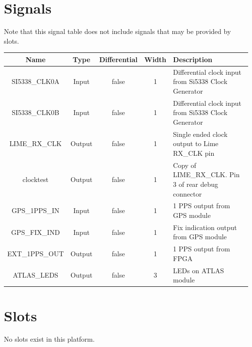 \documentclass{article}
\begin{document}
\section*{Signals}
Note that this signal table does not include signals that may be provided by slots. \\
\begin{tabular}{|c|c|c|c|p{8cm}|}
	\hline
	\rowcolor{blue}
	Name           & Type   & Differential & Width & Description                                          \\
	\hline
	SI5338\_CLK0A  & Input  & false        & 1     & Differential clock input from Si5338 Clock Generator \\
	\hline
	SI5338\_CLK0B  & Input  & false        & 1     & Differential clock input from Si5338 Clock Generator \\
	\hline
	LIME\_RX\_CLK  & Output & false        & 1     & Single ended clock output to Lime RX\_CLK pin        \\
	\hline
	clocktest      & Output & false        & 1     & Copy of LIME\_RX\_CLK. Pin 3 of rear debug connector \\
	\hline
	GPS\_1PPS\_IN  & Input  & false        & 1     & 1 PPS output from GPS module                         \\
	\hline
	GPS\_FIX\_IND  & Input  & false        & 1     & Fix indication output from GPS module                \\
	\hline
	EXT\_1PPS\_OUT & Output & false        & 1     & 1 PPS output from FPGA                               \\
	\hline
	ATLAS\_LEDS    & Output & false        & 3     & LEDs on ATLAS module                                 \\
	\hline
\end{tabular}
\pagebreak
\section*{Slots}
No slots exist in this platform.
\end{document}

